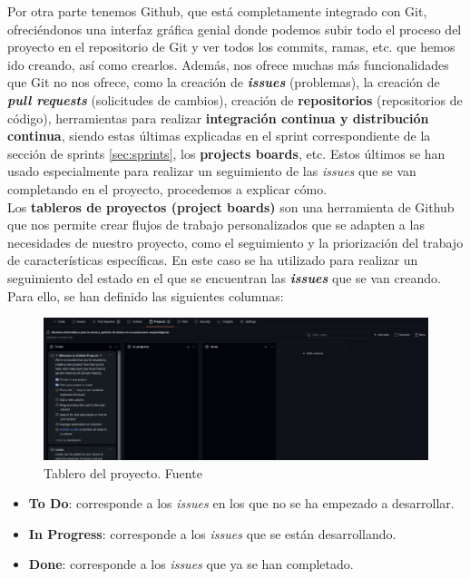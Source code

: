 Por otra parte tenemos Github, que está completamente integrado con Git, ofreciéndonos una
interfaz gráfica genial donde podemos subir todo el proceso del proyecto en el repositorio
de Git y ver todos los commits, ramas, etc. que hemos ido creando, así como crearlos.
Además, nos ofrece muchas más funcionalidades que Git no nos ofrece, como la creación de
\textbf{\textit{issues}} (problemas), la creación de \textbf{\textit{pull requests}}
(solicitudes de cambios), creación de \textbf{repositorios} (repositorios de código),
herramientas para realizar \textbf{integración continua y distribución continua}, siendo
estas últimas explicadas en el sprint correspondiente de la sección de sprints
\ref{sec:sprints}, los \textbf{projects boards}, etc. Estos últimos se han usado
especialmente para realizar un seguimiento de las \textit{issues} que se van completando en
el proyecto, procedemos a explicar cómo.\\

Los \textbf{tableros de proyectos (project boards)} \cite{project-boards} son una
herramienta de Github que nos permite crear flujos de trabajo personalizados que se adapten
a las necesidades de nuestro proyecto, como el seguimiento y la priorización del trabajo de
características específicas. En este caso se ha utilizado para realizar un seguimiento
del estado en el que se encuentran las \textbf{\textit{issues}} que se van creando. Para
ello, se han definido las siguientes columnas:

    \begin{figure}[H]
        \centering
        \includegraphics[scale=0.19]{imagenes/project-board.png}
        \caption[Tablero del proyecto]{Tablero del proyecto. Fuente \cite{project-board-image}}
        \label{fig:project-board}
    \end{figure}

    \begin{itemize}
        \item \textbf{To Do}: corresponde a los \textit{issues} en los que no se ha empezado
        a desarrollar.
        \item \textbf{In Progress}: corresponde a los \textit{issues} que se están
        desarrollando.
        \item \textbf{Done}: corresponde a los \textit{issues} que ya se han completado.
    \end{itemize}

